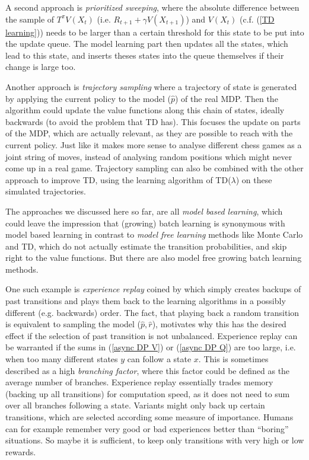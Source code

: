 A second approach is \emph{prioritized sweeping}, where the absolute difference between the sample of \(T^\pi V(X_t)\) (i.e. \(R_{t+1}+\gamma V(X_{t+1})\)) and \(V(X_t)\) (c.f. (\ref{TD learning})) needs to be larger than a certain threshold for this state to be put into the update queue. The model learning part then updates all the states, which lead to this state, and inserts theses states into the queue themselves if their change is large too. 

Another approach is \emph{trajectory sampling} where a trajectory of state is generated by applying the current policy to the model (\(\hat{p}\)) of the real MDP. Then the algorithm could update the value functions along this chain of states, ideally backwards (to avoid the problem that TD has). This focuses the update on parts of the MDP, which are actually relevant, as they are possible to reach with the current policy. Just like it makes more sense to analyse different chess games as a joint string of moves, instead of analysing random positions which might never come up in a real game. Trajectory sampling can also be combined with the other approach to improve TD, using the learning algorithm of TD(\(\lambda\)) on these simulated trajectories. 

The approaches we discussed here so far, are all \emph{model based learning}, which could leave the impression that (growing) batch learning is synonymous with model based learning in contrast to \emph{model free learning} methods like Monte Carlo and TD, which do not actually estimate the transition probabilities, and skip right to the value functions. But there are also model free growing batch learning methods. 

One such example is \emph{experience replay} coined by \textcite{linSelfimprovingReactiveAgents1992} which simply creates backups of past transitions and plays them back to the learning algorithms in a possibly different (e.g. backwards) order. The fact, that playing back a random transition is equivalent to sampling the model (\(\hat{p}, \hat{r}\)), motivates why this has the desired effect if the selection of past transition is not unbalanced. Experience replay can be warranted if the sums in (\ref{async DP V}) or (\ref{async DP Q}) are too large, i.e. when too many different states \(y\) can follow a state \(x\). This is sometimes described as a high \emph{branching factor}, where this factor could be defined as the average number of branches. Experience replay essentially trades memory (backing up all transitions) for computation speed, as it does not need to sum over all branches following a state. Variants might only back up certain transitions, which are selected according some measure of importance. Humans can for example remember very good or bad experiences better than ``boring'' situations. So maybe it is sufficient, to keep only transitions with very high or low rewards. 

